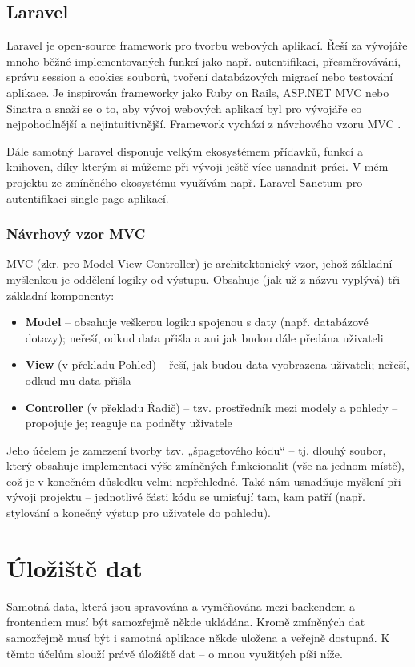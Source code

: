 	\subsection{Laravel}
	Laravel je open-source framework pro tvorbu webových aplikací. Řeší za vývojáře mnoho běžné implementovaných funkcí jako např. autentifikaci, přesměrovávání, správu session a cookies souborů, tvoření databázových migrací nebo testování aplikace. Je inspirován frameworky jako Ruby on Rails, ASP.NET MVC nebo Sinatra a snaží se o to, aby vývoj webových aplikací byl pro vývojáře co nejpohodlnější a nejintuitivnější. \cite{Laravel1} Framework vychází z návrhového vzoru MVC \cite{LaravelMVC}.
	
	Dále samotný Laravel disponuje velkým ekosystémem přídavků, funkcí a knihoven, díky kterým si můžeme při vývoji ještě více usnadnit práci. \cite{LaravelEco} V mém projektu ze zmíněného ekosystému využívám např. Laravel Sanctum pro autentifikaci single-page aplikací.
	
		\subsubsection{Návrhový vzor MVC}
		MVC (zkr. pro Model-View-Controller) je architektonický vzor, jehož základní myšlenkou je oddělení logiky od výstupu. Obsahuje (jak už z názvu vyplývá) tři základní komponenty:
		
		\begin{itemize}
			\item \textbf{Model} – obsahuje veškerou logiku spojenou s daty (např. databázové dotazy); neřeší, odkud data přišla a ani jak budou dále předána uživateli
			\item \textbf{View} (v překladu Pohled) – řeší, jak budou data vyobrazena uživateli; neřeší, odkud mu data přišla
			\item \textbf{Controller} (v překladu Řadič) – tzv. prostředník mezi modely a pohledy – propojuje je; reaguje na podněty uživatele
		\end{itemize}
	
		Jeho účelem je zamezení tvorby tzv. „špagetového kódu“ – tj. dlouhý soubor, který obsahuje implementaci výše zmíněných funkcionalit (vše na jednom místě), což je v konečném důsledku velmi nepřehledné. Také nám usnadňuje myšlení při vývoji projektu – jednotlivé části kódu se umisťují tam, kam patří (např. stylování a konečný výstup pro uživatele do pohledu). \cite{MVC}
		
\section{Úložiště dat}
Samotná data, která jsou spravována a vyměňována mezi backendem a frontendem musí být samozřejmě někde ukládána. Kromě zmíněných dat samozřejmě musí být i samotná aplikace někde uložena a veřejně dostupná. K těmto účelům slouží právě úložiště dat – o mnou využitých píši níže.

